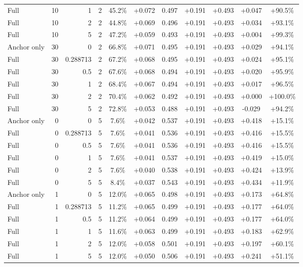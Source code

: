 \begin{table}[htbp]
\begin{tabular}{lrrrccccccc}
Full & 10 & 1 & 2 & 45.2\% & +0.072 & 0.497 & +0.191 & +0.493 & +0.047 & +90.5\% \\
Full & 10 & 2 & 2 & 44.8\% & +0.069 & 0.496 & +0.191 & +0.493 & +0.034 & +93.1\% \\
Full & 10 & 5 & 2 & 47.2\% & +0.059 & 0.493 & +0.191 & +0.493 & +0.004 & +99.3\% \\
Anchor only & 30 & 0 & 2 & 66.8\% & +0.071 & 0.495 & +0.191 & +0.493 & +0.029 & +94.1\% \\
Full & 30 & 0.288713 & 2 & 67.2\% & +0.068 & 0.495 & +0.191 & +0.493 & +0.024 & +95.1\% \\
Full & 30 & 0.5 & 2 & 67.6\% & +0.068 & 0.494 & +0.191 & +0.493 & +0.020 & +95.9\% \\
Full & 30 & 1 & 2 & 68.4\% & +0.067 & 0.494 & +0.191 & +0.493 & +0.017 & +96.5\% \\
Full & 30 & 2 & 2 & 70.4\% & +0.062 & 0.492 & +0.191 & +0.493 & +0.000 & +100.0\% \\
Full & 30 & 5 & 2 & 72.8\% & +0.053 & 0.488 & +0.191 & +0.493 & -0.029 & +94.2\% \\
Anchor only & 0 & 0 & 5 & 7.6\% & +0.042 & 0.537 & +0.191 & +0.493 & +0.418 & +15.1\% \\
Full & 0 & 0.288713 & 5 & 7.6\% & +0.041 & 0.536 & +0.191 & +0.493 & +0.416 & +15.5\% \\
Full & 0 & 0.5 & 5 & 7.6\% & +0.041 & 0.536 & +0.191 & +0.493 & +0.416 & +15.5\% \\
Full & 0 & 1 & 5 & 7.6\% & +0.041 & 0.537 & +0.191 & +0.493 & +0.419 & +15.0\% \\
Full & 0 & 2 & 5 & 7.6\% & +0.040 & 0.538 & +0.191 & +0.493 & +0.424 & +13.9\% \\
Full & 0 & 5 & 5 & 8.4\% & +0.037 & 0.543 & +0.191 & +0.493 & +0.434 & +11.9\% \\
Anchor only & 1 & 0 & 5 & 12.0\% & +0.065 & 0.498 & +0.191 & +0.493 & +0.173 & +64.8\% \\
Full & 1 & 0.288713 & 5 & 11.2\% & +0.065 & 0.499 & +0.191 & +0.493 & +0.177 & +64.0\% \\
Full & 1 & 0.5 & 5 & 11.2\% & +0.064 & 0.499 & +0.191 & +0.493 & +0.177 & +64.0\% \\
Full & 1 & 1 & 5 & 11.6\% & +0.063 & 0.499 & +0.191 & +0.493 & +0.183 & +62.9\% \\
Full & 1 & 2 & 5 & 12.0\% & +0.058 & 0.501 & +0.191 & +0.493 & +0.197 & +60.1\% \\
Full & 1 & 5 & 5 & 12.0\% & +0.050 & 0.506 & +0.191 & +0.493 & +0.241 & +51.1\% \\

\end{tabular}
\end{table}
